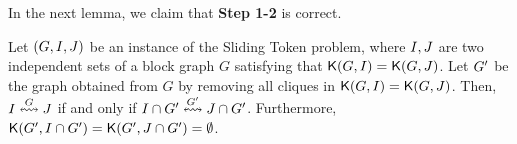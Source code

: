 \documentclass[a4paper]{llncs}
\begin{document}
In the next lemma, we claim that \textbf{Step 1-2} is correct.


\begin{lemma}
\label{lem:remove-all-confined-cliques}
Let $(G, I, J)$ be an instance of the {\sc Sliding Token} problem, where $I, J$ are two independent sets of a block graph $G$ satisfying that ${\mathsf K}{(G, I)} = {\mathsf K}{(G, J)}$.
Let ${G^\prime}$ be the graph obtained from $G$ by removing all cliques in ${\mathsf K}{(G, I)} = {\mathsf K}{(G, J)}$.
Then, $I \overset{G}{\leftrightsquigarrow} J$ if and only if $I \cap {G^\prime} \overset{{G^\prime}}{\leftrightsquigarrow} J \cap {G^\prime}$.
Furthermore, ${\mathsf K}{({G^\prime}, I \cap {G^\prime})} = {\mathsf K}{({G^\prime}, J \cap {G^\prime})} = \emptyset$.
\end{lemma}
\end{document}
